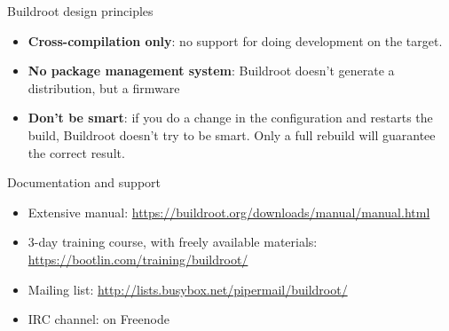 \documentclass[aspectratio=169,obeyspaces,spaces,hyphens,dvipsnames]{beamer}
\begin{document}
\begin{frame}{Buildroot design principles}

  \begin{itemize}

  \item {\bf Cross-compilation only}: no support for doing development
    on the target.

  \item {\bf No package management system}: Buildroot doesn't generate
    a distribution, but a firmware

  \item {\bf Don't be smart}: if you do a change in the configuration
    and restarts the build, Buildroot doesn't try to be smart. Only a
    full rebuild will guarantee the correct result.

  \end{itemize}

\end{frame}

\begin{frame}{Documentation and support}
  \begin{itemize}
  \item Extensive manual:
    \url{https://buildroot.org/downloads/manual/manual.html}
  \item 3-day training course, with freely available materials:
    \url{https://bootlin.com/training/buildroot/}
  \item Mailing list:
    \url{http://lists.busybox.net/pipermail/buildroot/}
  \item IRC channel:  on Freenode
  \end{itemize}
\end{frame}
\end{document}
